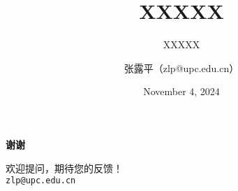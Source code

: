 \documentclass[
    10pt,
    aspectratio=169
    ]{beamer}
\title{XXXXX}
\subtitle{XXXXX}
\date{November 4, 2024}
\author{张露平（zlp@upc.edu.cn）}
\institute{经济管理学院-中国石油大学（华东）}
\begin{document}
\maketitle

\begin{spacing}{1.5}
    




    \appendix
    \begin{frame}[plain] %
        \centering
        \vspace{2cm} %
        \textbf{\LARGE{谢谢}}
        \vspace{1cm}

        \small
        欢迎提问，期待您的反馈！ \\
        \vspace{1cm}
        \texttt{zlp@upc.edu.cn}
    \end{frame}
\end{spacing}
\end{document}
